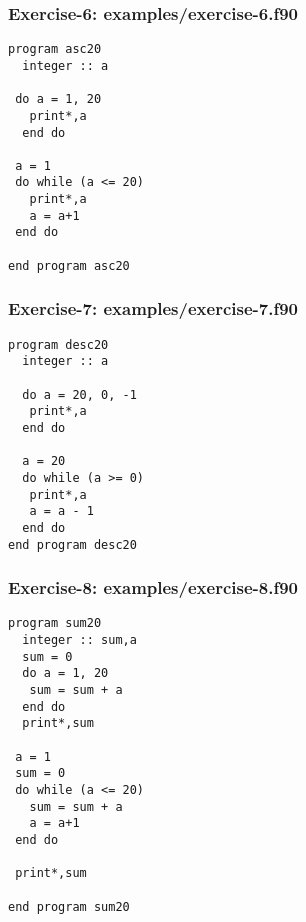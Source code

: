 \documentclass[xcolor=dvipsnames,dvip,notes=show,table]{beamer}
\begin{document}
\begin{frame}[fragile]
\frametitle{Exercise-6: examples/exercise-6.f90}
\scriptsize
\begin{lstlisting}
program asc20
  integer :: a
  
 do a = 1, 20
   print*,a
  end do

 a = 1 
 do while (a <= 20) 
   print*,a
   a = a+1
 end do

end program asc20
\end{lstlisting}
\end{frame}



\begin{frame}[fragile]
\frametitle{Exercise-7: examples/exercise-7.f90}
\scriptsize
\begin{lstlisting}
program desc20
  integer :: a

  do a = 20, 0, -1
   print*,a
  end do

  a = 20
  do while (a >= 0) 
   print*,a
   a = a - 1
  end do
end program desc20
\end{lstlisting}
\end{frame}




\begin{frame}[fragile]
\frametitle{Exercise-8: examples/exercise-8.f90}
\scriptsize
\begin{lstlisting}
program sum20
  integer :: sum,a
  sum = 0
  do a = 1, 20
   sum = sum + a    
  end do
  print*,sum

 a = 1 
 sum = 0
 do while (a <= 20) 
   sum = sum + a    
   a = a+1
 end do

 print*,sum

end program sum20
\end{lstlisting}
\end{frame}


\end{document}
